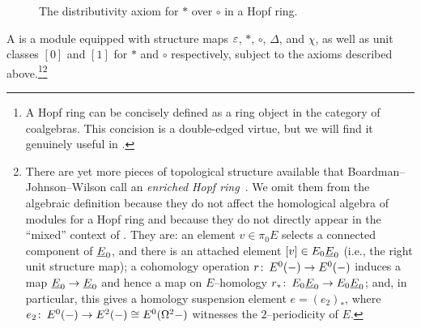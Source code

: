 \begin{figure}
\begin{center}
\end{center}
\caption{The distributivity axiom for \(\ast\) over \(\circ\) in a Hopf ring.}\label{DistributivityDiagram}
\end{figure}

\begin{definition}\label{HopfRingManualDefinition}
A  is a module equipped with structure maps \(\varepsilon\), \(\ast\), \(\circ\), \(\Delta\), and \(\chi\), as well as unit classes \([0]\) and \([1]\) for \(\ast\) and \(\circ\) respectively, subject to the axioms described above.\footnote{A Hopf ring can be concisely defined as a ring object in the category of coalgebras.  This concision is a double-edged virtue, but we will find it genuinely useful in .}\footnote{There are yet more pieces of topological structure available that Boardman--Johnson--Wilson call an \textit{enriched Hopf ring}~\cite[Section 10]{BJW}.  We omit them from the algebraic definition because they do not affect the homological algebra of modules for a Hopf ring and because they do not directly appear in the ``mixed'' context of .  They are: an element \(v \in \pi_0 E\) selects a connected component of \(\OS{E}{0}\), and there is an attached element \([v] \in E_0 \OS{E}{0}\) (i.e., the right unit structure map); a cohomology operation \(r\colon\thinspace E^0(-) \to E^0(-)\) induces a map \(\OS{E}{0} \to \OS{E}{0}\) and hence a map on \(E\)--homology \(r_*\co E_0 \OS{E}{0} \to E_0 \OS{E}{0}\); and, in particular, this gives a homology suspension element \(e = (e_2)_*\), where \(e_2\colon\thinspace E^0(-) \to E^2(-) \cong E^0(\Omega^2 -)\) witnesses the \(2\)--periodicity of \(E\).}
\end{definition}

